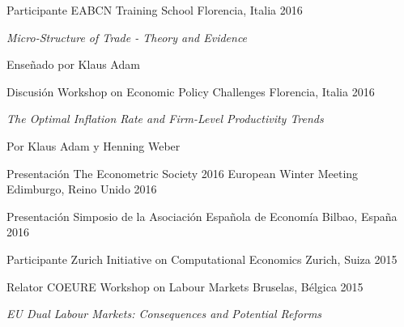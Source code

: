 

\begin{cventries}

\cventry
    {Participante} %
    {EABCN Training School} %
    {Florencia, Italia} %
    {2016} %
    {
        \begin{cvitems} %
            \item {\textit{Micro-Structure of Trade - Theory and Evidence}}
            \item {Enseñado por Klaus Adam}
        \end{cvitems}
    }

\cventry
    {Discusión} %
    {Workshop on Economic Policy Challenges} %
    {Florencia, Italia} %
    {2016} %
    {
        \begin{cvitems} %
            \item {\textit{The Optimal Inflation Rate and Firm-Level Productivity Trends}}
            \item {Por Klaus Adam y Henning Weber}
        \end{cvitems}
    }

\cventry
    {Presentación} %
    {The Econometric Society 2016 European Winter Meeting} %
    {Edimburgo, Reino Unido} %
    {2016} %
    {}

\cventry
    {Presentación} %
    {Simposio de la Asociación Española de Economía} %
    {Bilbao, España} %
    {2016} %
    {}

\cventry
    {Participante} %
    {Zurich Initiative on Computational Economics} %
    {Zurich, Suiza} %
    {2015} %
    {}

\cventry
    {Relator} %
    {COEURE Workshop on Labour Markets} %
    {Bruselas, Bélgica} %
    {2015} %
    {
      \begin{cvitems} %
        \item {\textit{EU Dual Labour Markets: Consequences and Potential Reforms}}
      \end{cvitems}
    }

\end{cventries}

